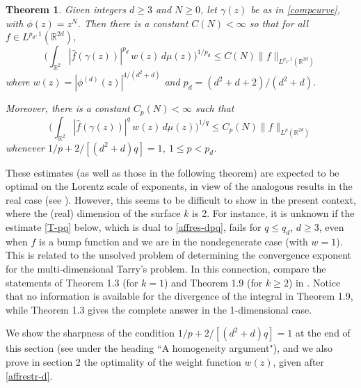 \documentclass[11 pt]{amsart}
\theoremstyle{plain}
\newtheorem{theorem}{Theorem}[section]
\numberwithin{equation}{section}
\theoremstyle{plain}
\numberwithin{equation}{section}
\theoremstyle{remark}
\begin{document}
\begin{theorem} \label{compthm}
Given integers $d\ge 3$ and $N\ge 0$, let $\gamma(z)$ be as in \eqref{compcurve}, with $\phi(z)=z^N$. Then there is a constant $C(N)<\infty$ so that for all $f\in L^{p_d
,1}({{\mathbb {R}}}^{2d})$,
\begin{equation} \label{affrestr-d}
\Big(\int_{{{\mathbb {R}}}^2}
 |\widehat f (\gamma(z) )|^{p_d} \,w(z) \, d\mu(z)\Big)^{1/p_d} \le
C(N)\|f\|_{L^{p_d ,1}({{\mathbb {R}}}^{2d})}
\end{equation}
where $w(z) = |\phi^{(d)}(z)|^{4/(d^2+d)}$ and $p_d = (d^2+d+2)/(d^2+d)$.

Moreover, there is a constant $C_p (N) <\infty$ such that
\begin{equation} \label{affres-dpq}
\Big(\int_{{{\mathbb {R}}}^2}
 |\widehat f (\gamma(z) )|^{q} \,w(z) \, d\mu(z)\Big)^{1/q} \le
C_p (N) \|f\|_{L^{p}({{\mathbb {R}}}^{2d})}
\end{equation}
whenever $1/p+ 2/[(d^2+d)q] = 1$, $1\le p< p_d$.
\end{theorem}
These estimates (as well as those in the following theorem) are expected to be optimal on the Lorentz scale of exponents, in view of the analogous results in the real case (see \cite{BOS1}). However, this seems to be difficult to show in the present context, where the (real) dimension of the surface $k$ is 2. For instance, it is unknown if the estimate \eqref{T-pq} below, which is dual to \eqref{affres-dpq}, fails for $q \le q_d$, $d\ge 3$, even when $f$ is a bump function and we are in the nondegenerate case (with $w=1$). This is related to the unsolved problem of determining the convergence exponent for the multi-dimensional Tarry's problem. In this connection, compare the statements of Theorem 1.3 (for $k=1$) and Theorem 1.9 (for $k\ge 2$) in \cite{ACK}. Notice that no information is available for the divergence of the integral in Theorem 1.9, while Theorem 1.3 gives the complete answer in the 1-dimensional case.

We show the sharpness of the condition $1/p+ 2/[(d^2+d)q] = 1$ at the end of this section (see under the heading ``A homogeneity argument"), and we also prove in section 2 the optimality of the weight function $w(z)$, given after \eqref{affrestr-d}.
\\
\end{document}
